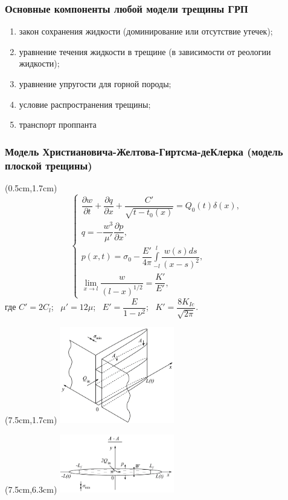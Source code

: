 \documentclass{beamer}
\begin{document}
\begin{frame}
\frametitle{Основные компоненты любой модели трещины ГРП}

\begin{enumerate}[1)]
	\item закон сохранения жидкости (доминирование или отсутствие утечек);
	\item уравнение течения жидкости в трещине (в зависимости от реологии жидкости);
	\item уравнение упругости для горной породы;
	\item условие распространения трещины;
	\item транспорт проппанта
\end{enumerate}

\end{frame}


\begin{frame}
\frametitle{Модель Христиановича-Желтова-Гиртсма-деКлерка (модель плоской трещины)}

\begin{textblock*}{7cm}(0.5cm,1.7cm)
$$
\begin{cases}
\dfrac{\partial w}{\partial t}+\dfrac{\partial q}{\partial x}+\dfrac{C'}{\sqrt{t-t_0(x)}}=Q_0(t)\delta(x),\\[15pt]
q=-\dfrac{w^3}{\mu'}\dfrac{\partial p}{\partial x},\\[5pt]
p(x,t)=\sigma_0-\dfrac{E'}{4\pi}\displaystyle\int\limits_{-l}^{l}\dfrac{w(s)ds}{(x-s)^2},\\[20pt]
\displaystyle\lim_{x\to l}\dfrac{w}{(l-x)^{1/2}}=\dfrac{K'}{E'},
\end{cases}
$$
где $C'=2C_l$; $\,\,\,\mu'=12\mu$; $\,\,\,E'=\dfrac{E}{1-\nu^2}$; $\,\,\,K'=\dfrac{8K_{Ic}}{\sqrt{2\pi}}$.
\end{textblock*}

\begin{textblock*}{7cm}(7.5cm,1.7cm)
\includegraphics[width=5cm]{kgd_model_3D.jpg}
\end{textblock*}

\begin{textblock*}{7cm}(7.5cm,6.3cm)
\includegraphics[width=5cm]{kgd_model_A-A_plane.jpg}
\end{textblock*}

\end{frame}
\end{document}
